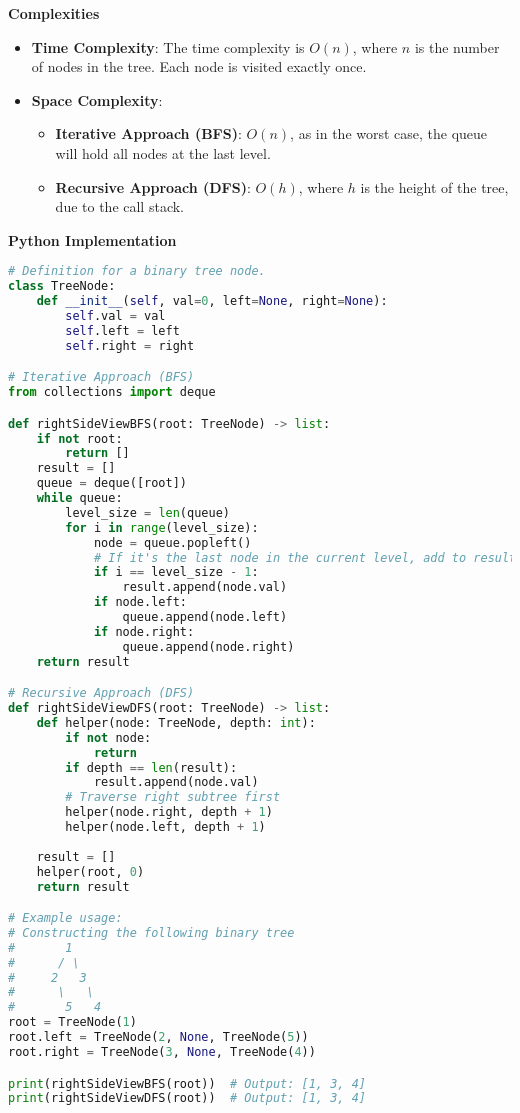 \textbf{Complexities}

\begin{itemize}
    \item \textbf{Time Complexity}: The time complexity is \(O(n)\), where \(n\) is the number of nodes in the tree. Each node is visited exactly once.
    \item \textbf{Space Complexity}: 
    \begin{itemize}
        \item \textbf{Iterative Approach (BFS)}: \(O(n)\), as in the worst case, the queue will hold all nodes at the last level.
        \item \textbf{Recursive Approach (DFS)}: \(O(h)\), where \(h\) is the height of the tree, due to the call stack.
    \end{itemize}
\end{itemize}

\textbf{Python Implementation}

\begin{lstlisting}[language=Python, xleftmargin=0.02\textwidth, xrightmargin=0.02\textwidth]
# Definition for a binary tree node.
class TreeNode:
    def __init__(self, val=0, left=None, right=None):
        self.val = val
        self.left = left
        self.right = right

# Iterative Approach (BFS)
from collections import deque

def rightSideViewBFS(root: TreeNode) -> list:
    if not root:
        return []
    result = []
    queue = deque([root])
    while queue:
        level_size = len(queue)
        for i in range(level_size):
            node = queue.popleft()
            # If it's the last node in the current level, add to result
            if i == level_size - 1:
                result.append(node.val)
            if node.left:
                queue.append(node.left)
            if node.right:
                queue.append(node.right)
    return result

# Recursive Approach (DFS)
def rightSideViewDFS(root: TreeNode) -> list:
    def helper(node: TreeNode, depth: int):
        if not node:
            return
        if depth == len(result):
            result.append(node.val)
        # Traverse right subtree first
        helper(node.right, depth + 1)
        helper(node.left, depth + 1)
    
    result = []
    helper(root, 0)
    return result

# Example usage:
# Constructing the following binary tree
#       1
#      / \
#     2   3
#      \   \
#       5   4
root = TreeNode(1)
root.left = TreeNode(2, None, TreeNode(5))
root.right = TreeNode(3, None, TreeNode(4))

print(rightSideViewBFS(root))  # Output: [1, 3, 4]
print(rightSideViewDFS(root))  # Output: [1, 3, 4]
\end{lstlisting}

